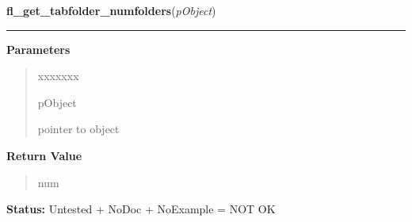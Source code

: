 \hspace{.8\funcindent}\begin{boxedminipage}{\funcwidth}

    \raggedright \textbf{fl\_get\_tabfolder\_numfolders}(\textit{pObject})

    \vspace{-1.5ex}

    \rule{\textwidth}{0.5\fboxrule}
\setlength{\parskip}{2ex}
\setlength{\parskip}{1ex}
      \textbf{Parameters}
      \vspace{-1ex}

      \begin{quote}
        \begin{Ventry}{xxxxxxx}

          \item[pObject]

          pointer to object

        \end{Ventry}

      \end{quote}

      \textbf{Return Value}
    \vspace{-1ex}

      \begin{quote}
      num

      \end{quote}

\textbf{Status:} Untested + NoDoc + NoExample = NOT OK



    \end{boxedminipage}

    \label{xformslib:library:fl_get_active_folder}

    \vspace{0.5ex}

